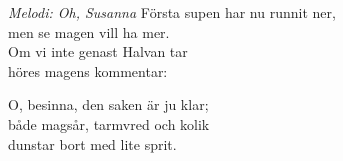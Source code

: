 {\footnotesize\textit{Melodi: Oh, Susanna}}
\vspace{10pt}
Första supen har nu runnit ner,\\
men se magen vill ha mer.\\
Om vi inte genast Halvan tar\\
höres magens kommentar:\par
\vspace{10pt}
O, besinna, den saken är ju klar;\\
både magsår, tarmvred och kolik\\
dunstar bort med lite sprit.
